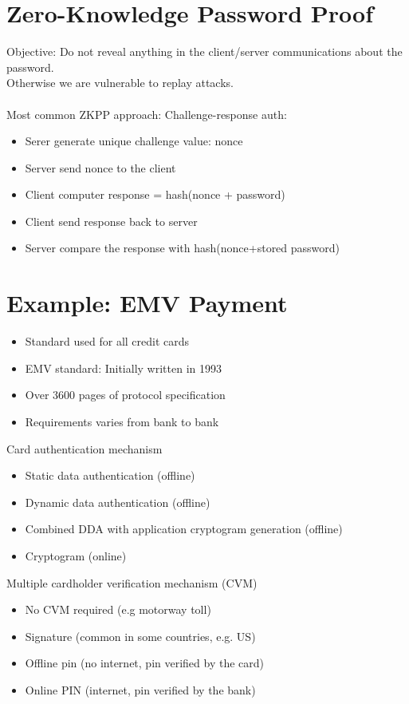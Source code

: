 \documentclass{article}[18pt]
\begin{document}
\section{Zero-Knowledge Password Proof}
Objective: Do not reveal anything in the client/server communications about the password.\\
Otherwise we are vulnerable to replay attacks.\\
\\
Most common ZKPP approach: Challenge-response auth:
\begin{itemize}
	\item Serer generate unique challenge value: nonce
	\item Server send nonce to the client
	\item Client computer response = hash(nonce + password)
	\item Client send response back to server
	\item Server compare the response with hash(nonce+stored password)
\end{itemize}
\section{Example: EMV Payment}
\begin{itemize}
	\item Standard used for all credit cards
	\item EMV standard: Initially written in 1993
	\item Over 3600 pages of protocol specification
	\item Requirements varies from bank to bank
\end{itemize}
Card authentication mechanism
\begin{itemize}
	\item Static data authentication (offline)
	\item Dynamic data authentication (offline)
	\item Combined DDA with application cryptogram generation (offline)
	\item Cryptogram (online)
\end{itemize}
Multiple cardholder verification mechanism (CVM)
\begin{itemize}
	\item No CVM required (e.g motorway toll)
	\item Signature (common in some countries, e.g. US)
	\item Offline pin (no internet, pin verified by the card)
	\item Online PIN (internet, pin verified by the bank)
\end{itemize}
\end{document}
